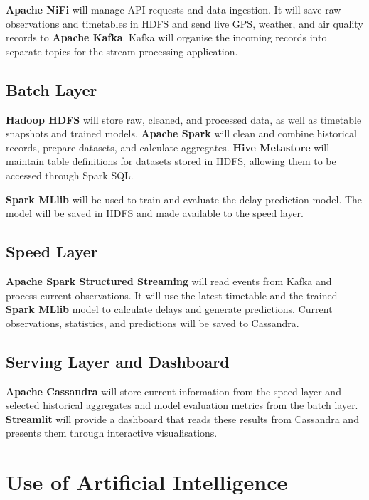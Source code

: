 \documentclass[11pt]{article}
\begin{document}
\textbf{Apache NiFi} will manage API requests and data ingestion. It will save raw observations and timetables in HDFS and send live GPS, weather, and air quality records to \textbf{Apache Kafka}. Kafka will organise the incoming records into separate topics for the stream processing application.

\subsection{Batch Layer}

\textbf{Hadoop HDFS} will store raw, cleaned, and processed data, as well as timetable snapshots and trained models. \textbf{Apache Spark} will clean and combine historical records, prepare datasets, and calculate aggregates. \textbf{Hive Metastore} will maintain table definitions for datasets stored in HDFS, allowing them to be accessed through Spark SQL.

\textbf{Spark MLlib} will be used to train and evaluate the delay prediction model. The model will be saved in HDFS and made available to the speed layer.

\subsection{Speed Layer}

\textbf{Apache Spark Structured Streaming} will read events from Kafka and process current observations. It will use the latest timetable and the trained \textbf{Spark MLlib} model to calculate delays and generate predictions. Current observations, statistics, and predictions will be saved to Cassandra.

\subsection{Serving Layer and Dashboard}

\textbf{Apache Cassandra} will store current information from the speed layer and selected historical aggregates and model evaluation metrics from the batch layer. \textbf{Streamlit} will provide a dashboard that reads these results from Cassandra and presents them through interactive visualisations.

\section{Use of Artificial Intelligence}
\end{document}
